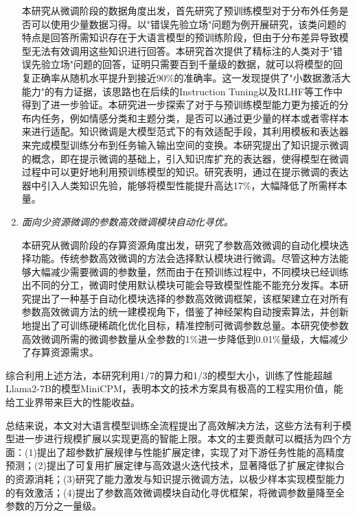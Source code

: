 \begin{enumerate}
本研究从微调阶段的数据角度出发，首先研究了预训练模型对于分布外任务是否可以使用少量数据习得。以"错误先验立场"问题为例开展研究，该类问题的特点是回答所需知识存在于大语言模型的预训练阶段，但由于分布差异导致模型无法有效调用这些知识进行回答。本研究首次提供了精标注的人类对于"错误先验立场"问题的回答，证明只需要百到千量级的数据，就可以将模型的回复正确率从随机水平提升到接近90\%的准确率。这一发现提供了"小数据激活大能力"的有力证据，该思路也在后续的Instruction Tuning以及RLHF等工作中得到了进一步验证。本研究进一步探索了对于与预训练模型能力更为接近的分布内任务，例如情感分类和主题分类，是否可以通过更少量的样本或者零样本来进行适配。知识微调是大模型范式下的有效适配手段，其利用模板和表达器来完成模型训练分布到任务输入输出空间的变换。本研究提出了知识提示微调的概念，即在提示微调的基础上，引入知识库扩充的表达器，使得模型在微调过程中可以更好地利用预训练模型的知识。研究表明，通过在提示微调的表达器中引入人类知识先验，能够将模型性能提升高达17\%，大幅降低了所需样本量。

\item \textit{面向少资源微调的参数高效微调模块自动化寻优。} 

本研究从微调阶段的存算资源角度出发，研究了参数高效微调的自动化模块选择功能。传统参数高效微调的方法会选择默认模块进行微调。尽管这种方法能够大幅减少需要微调的参数量，然而由于在预训练过程中，不同模块已经训练出不同的分工，微调时使用默认模块可能会导致模型性能不能充分发挥。本研究提出了一种基于自动化模块选择的参数高效微调框架，该框架建立在对所有参数高效微调方法的统一建模视角下，借鉴了神经架构自动搜索算法，并创新地提出了可训练硬稀疏化优化目标，精准控制可微调参数总量。本研究使参数高效微调所需的微调参数量从全参数的1\%进一步降低到0.01\%量级，大幅减少了存算资源需求。

\end{enumerate}


综合利用上述方法，本研究利用1/7的算力和1/3的模型大小，训练了性能超越Llama2-7B的模型MiniCPM，表明本文的技术方案具有极高的工程实用价值，能给工业界带来巨大的性能收益。


总结来说，本文对大语言模型训练全流程提出了高效解决方法，这些方法有利于模型进一步进行规模扩展以实现更高的智能上限。本文的主要贡献可以概括为四个方面：(1)提出了超参数扩展规律与性能扩展定律，实现了对下游任务性能的高精度预测；(2)提出了可复用扩展定律与高效退火迭代技术，显著降低了扩展定律拟合的资源消耗；(3)研究了能力激发与知识提示微调方法，以极少样本实现模型能力的有效激活；(4)提出了参数高效微调模块自动化寻优框架，将微调参数量降至全参数的万分之一量级。

